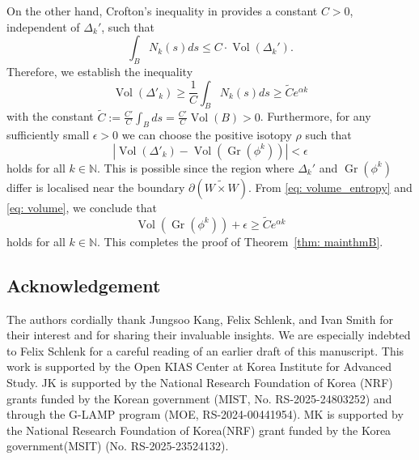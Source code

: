 \documentclass[12pt]{article}
\renewcommand{\leq}{\leqslant}
\renewcommand{\ge}{\geqslant}
\theoremstyle{theorem}
\theoremstyle{definition}
\theoremstyle{remark}
\numberwithin{equation}{section}
\newcommand{\p}{\partial}
\newcommand{\N}{{\mathbb{N}}}
\DeclareMathOperator{\floer}{Floer}
\DeclareMathOperator{\Vol}{Vol}
\DeclareMathOperator{\Gr}{Gr}
\begin{document}
On the other hand, Crofton's inequality in \cite[Lemma~3.4]{BaLe25} provides a constant $C>0$, independent of $\Delta_k'$, such that
$$
\int_B N_k(s)ds \leq C\cdot \Vol(\Delta_k').
$$
Therefore, we establish the inequality
\begin{equation}\label{eq: volume_entropy}
\Vol(\Delta'_{k})\ge \frac{1}{C}\int_B N_{k}(s)ds \ge \tilde{C}e^{\alpha k}
\end{equation}
with the constant $\tilde{C}:=\frac{C'}{C}\int_Bds=\frac{C'}{C}\Vol(B)>0$.
Furthermore, for any sufficiently small $\epsilon>0$ we can choose the positive isotopy $\rho$ such that
\begin{equation}\label{eq: volume}
|\Vol(\Delta'_k)- \Vol(\Gr(\phi^k))|<\epsilon
\end{equation}
holds for all $k\in\N$.
This is possible since the region where $\Delta_k'$ and $\Gr(\phi^k)$ differ is localised near the boundary $\p (\widetilde{W\times W})$.
From \eqref{eq: volume_entropy} and \eqref{eq: volume}, we conclude that
$$
\Vol(\Gr(\phi^k))+\epsilon \ge \tilde{C}e^{\alpha k}
$$
holds for all $k\in \N$.
This completes the proof of Theorem~\ref{thm: mainthmB}.




\subsection*{Acknowledgement}
The authors cordially thank Jungsoo Kang, Felix Schlenk, and Ivan Smith for their interest and for sharing their invaluable insights.
We are especially indebted to Felix Schlenk for a careful reading of an earlier draft of this manuscript.
This work is supported by the Open KIAS Center at Korea Institute for Advanced Study.
JK is supported by the National Research Foundation of Korea (NRF) grants funded by the Korean government (MIST, No. RS-2025-24803252) and through the G-LAMP program (MOE, RS-2024-00441954).
MK is supported by the National Research Foundation of Korea(NRF) grant funded by the Korea government(MSIT) (No. RS-2025-23524132).


\small

\end{document}
